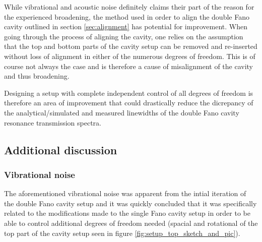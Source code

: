 While vibrational and acoustic noise definitely claims their part of the reason for the experienced broadening, the method used in order to align the double Fano cavity outlined in section \ref{sec:alignment} has potential for improvement. When going through the process of aligning the cavity, one relies on the assumption that the top and bottom parts of the cavity setup can be removed and re-inserted without loss of alignment in either of the numerous degrees of freedom. This is of course not always the case and is therefore a cause of misalignment of the cavity and thus broadening. 

Designing a setup with complete independent control of all degrees of freedom is therefore an area of improvement that could drastically reduce the dicrepancy of the analytical/simulated and measured linewidths of the double Fano cavity resonance transmission spectra.

\subsection{Additional discussion}\label{sec:additional_discussion}

\subsubsection{Vibrational noise}

The aforementioned vibrational noise was apparent from the intial iteration of the double Fano cavity setup and it was quickly concluded that it was specifically related to the modifications made to the single Fano cavity setup in order to be able to control additional degrees of freedom needed (spacial and rotational of the top part of the cavity setup seen in figure \ref{fig:setup_top_sketch_and_pic}). 

